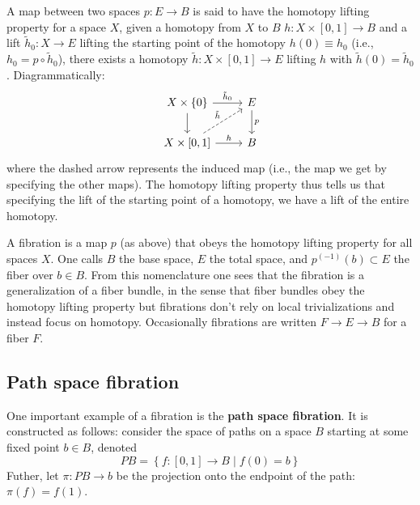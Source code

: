 \documentclass{report}
\begin{document}
 A map between two spaces $ p : E \to B $ is
said to have the homotopy lifting property for a space $ X $, given a homotopy 
from $ X $ to $ B $ $ h:X\times[0,1] \to B $ and a lift $ \tilde{h}_0 : X \to E $ 
lifting the starting point of the homotopy $ h(0) \equiv h_0 $ (i.e., $ h_0 = 
p\circ \tilde{h}_0 $), there exists a homotopy $ \tilde{h} : X\times [0,1] \to E $ 
lifting $ h $ with $\tilde{h}(0) = \tilde{h}_0$. Diagrammatically:
\begin{equation*}
	\begin{tikzcd}
	X\times \left\{0\right\} \arrow[r, "\tilde{h}_0"] \arrow[d]
		& E \arrow[d, "p"] \\
	X\times\left[0, 1\right] \arrow[r, "h"] \arrow[from=2-1, to=1-2, "\tilde{h}", dashrightarrow]
		& B
	\end{tikzcd}
\end{equation*}
where the dashed arrow represents the induced map (i.e., the map we get by 
specifying the other maps). The homotopy lifting property thus tells us that 
specifying the lift of the starting point of a homotopy, we have a lift of the 
entire homotopy.

 A fibration is a map $ p $ (as above) that obeys the 
homotopy lifting property for all spaces $ X $. One calls $ B $ the base space, 
$ E $ the total space, and $ p^{(-1)} (b) \subset E $ the fiber over $ b\in B $. 
From this nomenclature one sees that the fibration is a generalization of a 
fiber bundle, in the sense that fiber bundles obey the homotopy lifting property 
but fibrations don't rely on local trivializations and instead focus on homotopy. 
Occasionally fibrations are written $ F \rightarrow E \rightarrow B $ for a 
fiber $ F $. 

\subsection{Path space fibration}
One important example of a fibration is the \textbf{path space fibration}. It 
is constructed as follows: consider the space of paths on a space $ B $ starting
at some fixed point $ b\in B $, denoted
\begin{equation*}
	PB = \left\{ f : [0,1] \to B \mid f(0) = b \right\}
\end{equation*}
Futher, let $ \pi : PB \to b$ be the projection onto the endpoint of the path: 
$ \pi(f) = f(1) $. 
\end{document}
